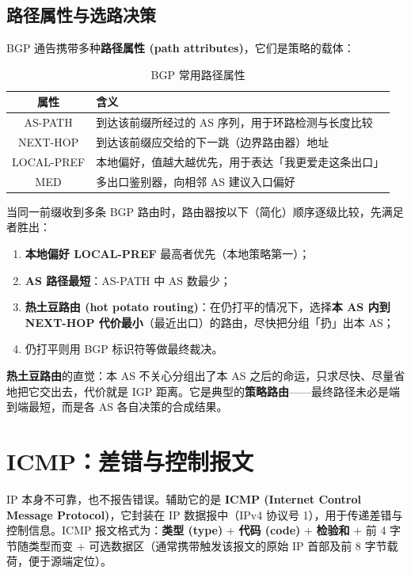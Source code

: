 \subsection{路径属性与选路决策}

BGP 通告携带多种\textbf{路径属性 (path attributes)}，它们是策略的载体：

\begin{table}[H]
\centering
\caption{BGP 常用路径属性}
\renewcommand{\arraystretch}{1.3}
\begin{tabulary}{\textwidth}{@{}CL@{}}
\toprule
\textbf{属性} & \textbf{含义} \\
\midrule
AS-PATH & 到达该前缀所经过的 AS 序列，用于环路检测与长度比较 \\
NEXT-HOP & 到达该前缀应交给的下一跳（边界路由器）地址 \\
LOCAL-PREF & 本地偏好，值越大越优先，用于表达「我更爱走这条出口」 \\
MED & 多出口鉴别器，向相邻 AS 建议入口偏好 \\
\bottomrule
\end{tabulary}
\end{table}

当同一前缀收到多条 BGP 路由时，路由器按以下（简化）顺序逐级比较，先满足者胜出：

\begin{enumerate}
    \item \textbf{本地偏好 LOCAL-PREF} 最高者优先（本地策略第一）；
    \item \textbf{AS 路径最短}：AS-PATH 中 AS 数最少；
    \item \textbf{热土豆路由 (hot potato routing)}：在仍打平的情况下，选择\textbf{本 AS 内到 NEXT-HOP 代价最小}（最近出口）的路由，尽快把分组「扔」出本 AS；
    \item 仍打平则用 BGP 标识符等做最终裁决。
\end{enumerate}

\textbf{热土豆路由}的直觉：本 AS 不关心分组出了本 AS 之后的命运，只求尽快、尽量省地把它交出去，代价就是 IGP 距离。它是典型的\textbf{策略路由}——最终路径未必是端到端最短，而是各 AS 各自决策的合成结果。

\section{ICMP：差错与控制报文}

IP 本身不可靠，也不报告错误。辅助它的是 \textbf{ICMP (Internet Control Message Protocol)}，它封装在 IP 数据报中（IPv4 协议号 1），用于传递差错与控制信息。ICMP 报文格式为：\textbf{类型 (type)} $+$ \textbf{代码 (code)} $+$ \textbf{检验和} $+$ 前 4 字节随类型而变 $+$ 可选数据区（通常携带触发该报文的原始 IP 首部及前 8 字节载荷，便于源端定位）。

